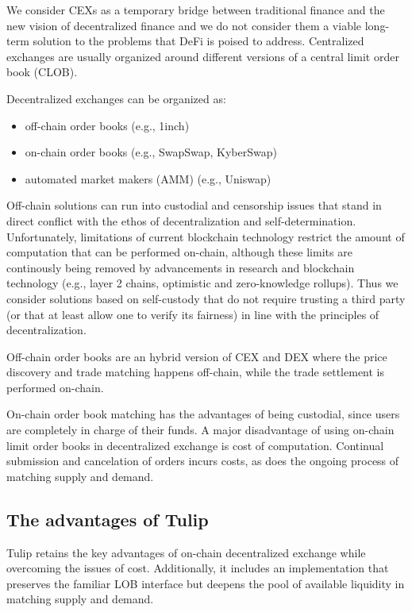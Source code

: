 \documentclass[11pt, reqno]{amsart}
\theoremstyle{definition}
\theoremstyle{remark}
\begin{document}
We consider CEXs as a temporary bridge between traditional finance and the
new vision of decentralized finance and we do not consider them a viable
long-term solution to the problems that DeFi is poised to address.
Centralized exchanges are usually organized around different versions of a
central limit order book (CLOB).

Decentralized exchanges can be organized as:
\begin{itemize}
    \item off-chain order books (e.g., 1inch)
    \item on-chain order books (e.g., SwapSwap, KyberSwap)
    \item automated market makers (AMM) (e.g., Uniswap)
\end{itemize}

Off-chain solutions can run into custodial and censorship issues that stand
in direct conflict with the ethos of decentralization and self-determination.
Unfortunately, limitations of current blockchain technology restrict
the amount of computation that can be performed on-chain, although these limits
are continously being removed by advancements in research and blockchain
technology (e.g., layer 2 chains, optimistic and zero-knowledge rollups).
Thus we consider solutions based on self-custody that do not require
trusting a third party (or that at least allow one to verify its fairness) in
line with the principles of decentralization.

Off-chain order books are an hybrid version of CEX and DEX where the price
discovery and trade matching happens off-chain, while the trade settlement is
performed on-chain.

On-chain order book matching has the advantages of being custodial, since users
are completely in charge of their funds.
A major disadvantage of using on-chain limit order books in decentralized
exchange is cost of computation. Continual submission and cancelation of orders
incurs costs, as does the ongoing process of matching supply and demand.

\subsection{The advantages of Tulip}

Tulip retains the key advantages of on-chain decentralized exchange while
overcoming the issues of cost. Additionally, it includes an implementation
that preserves the familiar LOB interface but deepens the pool of available
liquidity in matching supply and demand.
\end{document}
